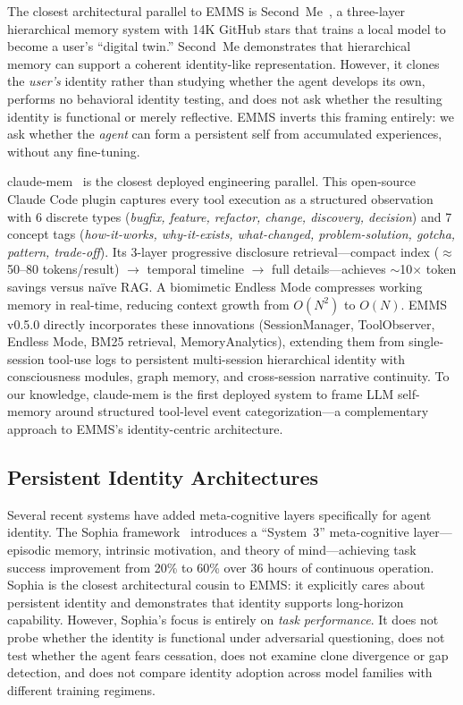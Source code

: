\documentclass[conference]{IEEEtran}
\begin{document}
The closest architectural parallel to EMMS is Second~Me~\cite{secondme2025}, a three-layer hierarchical memory system with 14K GitHub stars that trains a local model to become a user's ``digital twin.'' Second~Me demonstrates that hierarchical memory can support a coherent identity-like representation. However, it clones the \emph{user's} identity rather than studying whether the agent develops its own, performs no behavioral identity testing, and does not ask whether the resulting identity is functional or merely reflective. EMMS inverts this framing entirely: we ask whether the \emph{agent} can form a persistent self from accumulated experiences, without any fine-tuning.

claude-mem~\cite{claudemem2025} is the closest deployed engineering parallel. This open-source Claude Code plugin captures every tool execution as a structured observation with 6 discrete types (\textit{bugfix, feature, refactor, change, discovery, decision}) and 7 concept tags (\textit{how-it-works, why-it-exists, what-changed, problem-solution, gotcha, pattern, trade-off}). Its 3-layer progressive disclosure retrieval---compact index ($\approx$50--80 tokens/result) $\to$ temporal timeline $\to$ full details---achieves $\sim$10$\times$ token savings versus na\"ive RAG. A biomimetic Endless Mode compresses working memory in real-time, reducing context growth from $O(N^2)$ to $O(N)$. EMMS v0.5.0 directly incorporates these innovations (SessionManager, ToolObserver, Endless Mode, BM25 retrieval, MemoryAnalytics), extending them from single-session tool-use logs to persistent multi-session hierarchical identity with consciousness modules, graph memory, and cross-session narrative continuity. To our knowledge, claude-mem is the first deployed system to frame LLM self-memory around structured tool-level event categorization---a complementary approach to EMMS's identity-centric architecture.

\subsection{Persistent Identity Architectures}

Several recent systems have added meta-cognitive layers specifically for agent identity. The Sophia framework~\cite{sophia2025} introduces a ``System~3'' meta-cognitive layer---episodic memory, intrinsic motivation, and theory of mind---achieving task success improvement from 20\% to 60\% over 36 hours of continuous operation. Sophia is the closest architectural cousin to EMMS: it explicitly cares about persistent identity and demonstrates that identity supports long-horizon capability. However, Sophia's focus is entirely on \emph{task performance}. It does not probe whether the identity is functional under adversarial questioning, does not test whether the agent fears cessation, does not examine clone divergence or gap detection, and does not compare identity adoption across model families with different training regimens.
\end{document}

